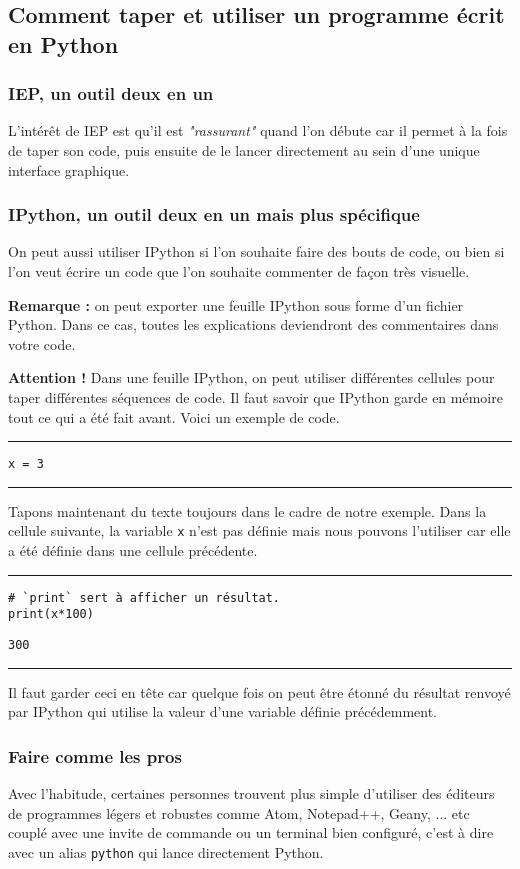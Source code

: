 \subsection{Comment taper et utiliser un programme écrit en Python}

\subsubsection{IEP, un outil deux en un}

L'intérêt de IEP est qu'il est \textit{"rassurant"} quand l'on débute car il permet à la fois de taper son code, puis ensuite de le lancer directement au sein d'une unique interface graphique.


\subsubsection{IPython, un outil deux en un mais plus spécifique}

On peut aussi utiliser IPython si l'on souhaite faire des bouts de code, ou bien si l'on veut écrire un code que l'on souhaite commenter de façon très visuelle.

\textbf{Remarque :} on peut exporter une feuille IPython sous forme d'un fichier Python. Dans ce cas, toutes les explications deviendront des commentaires dans votre code.

\textbf{Attention !} Dans une feuille IPython, on peut utiliser différentes cellules pour taper différentes séquences de code. Il faut savoir que IPython garde en mémoire tout ce qui a été fait avant. Voici un exemple de code.


\bigskip
{\hrule height .5mm}
\begin{verbatim}
x = 3
\end{verbatim}
{\hrule height .5mm}
\bigskip


Tapons maintenant du texte toujours dans le cadre de notre exemple. Dans la cellule suivante, la variable \texttt{x} n'est pas définie mais nous pouvons l'utiliser car elle a été définie dans une cellule précédente.


\bigskip
{\hrule height .5mm}
\begin{verbatim}
# `print` sert à afficher un résultat.
print(x*100)
\end{verbatim}
 \color{ForestGreen}
\vspace{-1.5em}
\begin{verbatim}
300
\end{verbatim} \color{Black}
{\hrule height .5mm}
\bigskip


Il faut garder ceci en tête car quelque fois on peut être étonné du résultat renvoyé par IPython qui utilise la valeur d'une variable définie précédemment.


\subsubsection{Faire comme les pros}

Avec l'habitude, certaines personnes trouvent plus simple d'utiliser des éditeurs de programmes légers et robustes comme Atom, Notepad++, Geany, ... etc couplé avec une invite de commande ou un terminal bien configuré, c'est à dire avec un alias \texttt{python} qui lance directement Python.